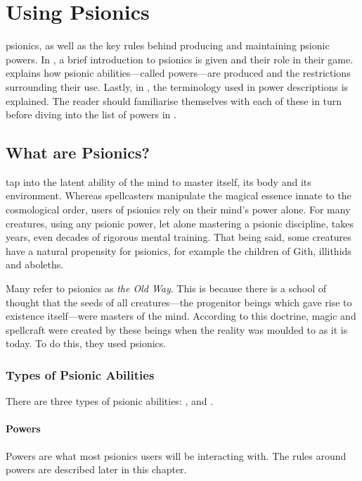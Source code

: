 \chapter{Using Psionics}
\label{chap:using_psionics}
psionics, as well as the key rules behind
producing and maintaining psionic powers.
In ,
a brief introduction to psionics is given
and their role in their game.
 explains how
psionic abilities---called powers---are produced
and the restrictions surrounding their use.
Lastly,
in ,
the terminology used in power descriptions is explained.
The reader should familiarise themselves with each of these in turn
before diving into
the list of powers in .

\section{What are Psionics?}
\label{sec:what_are_psionics}
 tap into the latent ability of the mind
to master itself, its body and its environment.
Whereas spellcasters manipulate the magical essence
innate to the cosmological order,
users of psionics rely on their mind's power alone.
For many creatures,
using any psionic power,
let alone mastering a psionic discipline,
takes years, even decades of rigorous mental training.
That being said,
some creatures have a natural propensity for psionics,
for example the children of Gith, illithids and aboleths.

Many refer to psionics as \emph{the Old Way}.
This is because there is a school of thought that
the seeds of all creatures---the progenitor beings
which gave rise to existence itself---were
masters of the mind.
According to this doctrine,
magic and spellcraft were created by these
beings when the reality was moulded to as it is today.
To do this, they used psionics.

\subsection{Types of Psionic Abilities}
There are three types of psionic abilities:
, 
and .

\subsubsection{Powers}
Powers are what most psionics users will be
interacting with.
The rules around powers are described
later in this chapter.

